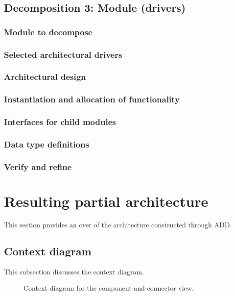 \documentclass[a4paper,10pt]{article}
\begin{document}
\subsection{Decomposition 3: Module (drivers)}
\subsubsection{Module to decompose}
\subsubsection{Selected architectural drivers}
\subsubsection{Architectural design}
\subsubsection{Instantiation and allocation of functionality}
\subsubsection{Interfaces for child modules}
\subsubsection{Data type definitions}
\subsubsection{Verify and refine}

\section{Resulting partial architecture}\label{sec:architecture}
This section provides an over of the architecture constructed through ADD\@.

\subsection{Context diagram}
This subsection discusses the context diagram.

\begin{figure}[!htp]
    \centering
    \caption{Context diagram for the component-and-connector view.
        }\label{fig:cc_context}
\end{figure}
\end{document}
